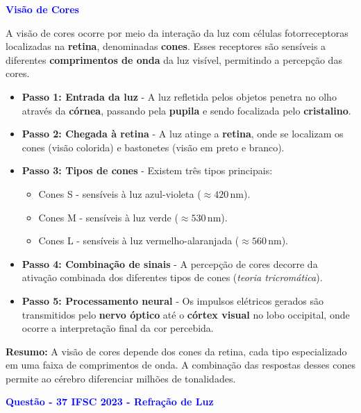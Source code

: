 \begin{flushleft}

\textbf{\textcolor{blue}{\Large Vis\~ao de Cores}}\\
\noindent

A vis\~ao de cores ocorre por meio da intera\c{c}\~ao da luz com c\'elulas fotorreceptoras localizadas na \textbf{retina}, 
denominadas \textbf{cones}. Esses receptores s\~ao sens\'iveis a diferentes \textbf{comprimentos de onda} da luz vis\'ivel, 
permitindo a percep\c{c}\~ao das cores.

\begin{itemize}
    \item \textbf{Passo 1: Entrada da luz} - A luz refletida pelos objetos penetra no olho atrav\'es da \textbf{c\'ornea}, 
    passando pela \textbf{pupila} e sendo focalizada pelo \textbf{cristalino}.
    \item \textbf{Passo 2: Chegada \`a retina} - A luz atinge a \textbf{retina}, onde se localizam os cones (vis\~ao colorida) 
    e bastonetes (vis\~ao em preto e branco).
    \item \textbf{Passo 3: Tipos de cones} - Existem tr\^es tipos principais:
    \begin{itemize}
        \item Cones S - sens\'iveis \`a luz azul-violeta ($\approx 420\,\text{nm}$).
        \item Cones M - sens\'iveis \`a luz verde ($\approx 530\,\text{nm}$).
        \item Cones L - sens\'iveis \`a luz vermelho-alaranjada ($\approx 560\,\text{nm}$).
    \end{itemize}
    \item \textbf{Passo 4: Combina\c{c}\~ao de sinais} - A percep\c{c}\~ao de cores decorre da ativa\c{c}\~ao combinada dos diferentes 
    tipos de cones (\textit{teoria tricrom\'atica}).
    \item \textbf{Passo 5: Processamento neural} - Os impulsos el\'etricos gerados s\~ao transmitidos pelo \textbf{nervo \'optico} at\'e 
    o \textbf{c\'ortex visual} no lobo occipital, onde ocorre a interpreta\c{c}\~ao final da cor percebida.
\end{itemize}

\textbf{Resumo:} A vis\~ao de cores depende dos cones da retina, cada tipo especializado em uma faixa de comprimentos de onda. A combina\c{c}\~ao das respostas desses cones permite ao c\'erebro diferenciar milh\~oes de tonalidades.


\textbf{\textcolor{blue}{\Large Quest\~ao - 37 IFSC 2023 - Refração de Luz}}\\
\noindent


\end{flushleft}
